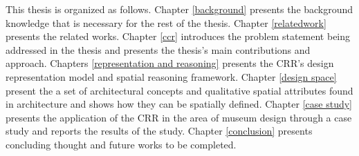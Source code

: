 \documentclass[12pt]{ucthesis}
\begin{document}
This thesis is organized as follows. Chapter \ref{background} presents the background knowledge that is necessary for the rest of the thesis. Chapter \ref{relatedwork} presents the related works. Chapter \ref{ccr} introduces the problem statement being addressed in the thesis and presents the thesis's main contributions and approach. Chapters \ref{representation and reasoning} presents the CRR's design representation model and spatial reasoning framework. Chapter \ref{design space} present the a set of architectural concepts and qualitative spatial attributes found in architecture and shows how they can be spatially defined. Chapter \ref{case study} presents the application of the CRR in the area of museum design through a case study and reports the results of the study. Chapter \ref{conclusion} presents concluding thought and future works to be completed. 





\end{document}
